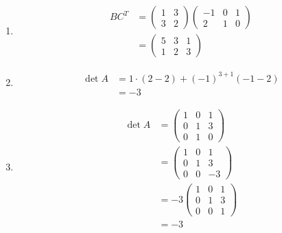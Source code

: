 \documentclass[11pt]{article} %
\begin{document}
\begin{enumerate}
	\item 
	\begin{align*}
		BC^T&=\begin{pmatrix}
			1&3\\3&2
		\end{pmatrix}\begin{pmatrix}
		-1&0&1\\2&1&0
	\end{pmatrix}\\
&=\begin{pmatrix}
	5&3&1\\1&2&3
\end{pmatrix}
	\end{align*}

\item 
\begin{align*}
	\det A&= 1\cdot (2-2)+(-1)^{3+1}(-1-2)\\
	&= -3
\end{align*}

\item 
\begin{align*}
	\det A&= \begin{pmatrix}
		1&0&1\\0&1&3\\0&1&0
	\end{pmatrix}\\
&=\begin{pmatrix}
	1&0&1\\0&1&3\\0&0&-3
\end{pmatrix}\\
&=-3\begin{pmatrix}
	1&0&1\\0&1&3\\0&0&1
\end{pmatrix}\\
&=-3
\end{align*}





\end{enumerate}
\end{document}
